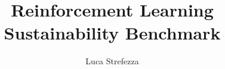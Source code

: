 \documentclass[12pt,a4paper,oneside,titlepage]{article}
\begin{document}
	\author{Luca Strefezza}
	\title{Reinforcement Learning Sustainability Benchmark}
	\maketitle
	
	{
		\hypersetup{linkcolor=black}
		\tableofcontents
	}
	
	
	
	
	
	\printbibliography[heading=bibintoc]
	
\end{document}
